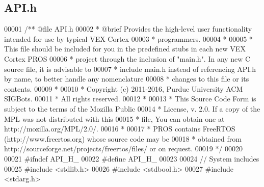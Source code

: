 \subsection{A\+P\+I.\+h}
\label{_a_p_i_8h_source}

\begin{DoxyCode}
00001 \textcolor{comment}{/** @file API.h}
00002 \textcolor{comment}{ * @brief Provides the high-level user functionality intended for use by typical VEX Cortex}
00003 \textcolor{comment}{ * programmers.}
00004 \textcolor{comment}{ *}
00005 \textcolor{comment}{ * This file should be included for you in the predefined stubs in each new VEX Cortex PROS}
00006 \textcolor{comment}{ * project through the inclusion of "main.h". In any new C source file, it is advisable to}
00007 \textcolor{comment}{ * include main.h instead of referencing API.h by name, to better handle any nomenclature}
00008 \textcolor{comment}{ * changes to this file or its contents.}
00009 \textcolor{comment}{ *}
00010 \textcolor{comment}{ * Copyright (c) 2011-2016, Purdue University ACM SIGBots.}
00011 \textcolor{comment}{ * All rights reserved.}
00012 \textcolor{comment}{ *}
00013 \textcolor{comment}{ * This Source Code Form is subject to the terms of the Mozilla Public}
00014 \textcolor{comment}{ * License, v. 2.0. If a copy of the MPL was not distributed with this}
00015 \textcolor{comment}{ * file, You can obtain one at http://mozilla.org/MPL/2.0/.}
00016 \textcolor{comment}{ *}
00017 \textcolor{comment}{ * PROS contains FreeRTOS (http://www.freertos.org) whose source code may be}
00018 \textcolor{comment}{ * obtained from http://sourceforge.net/projects/freertos/files/ or on request.}
00019 \textcolor{comment}{ */}
00020 
00021 \textcolor{preprocessor}{#}\textcolor{preprocessor}{ifndef} \textcolor{preprocessor}{API\_H\_}
00022 \textcolor{preprocessor}{#}\textcolor{preprocessor}{define} \textcolor{preprocessor}{API\_H\_}
00023 
00024 \textcolor{comment}{// System includes}
00025 \textcolor{preprocessor}{#}\textcolor{preprocessor}{include} \textcolor{preprocessor}{<}\textcolor{preprocessor}{stdlib}\textcolor{preprocessor}{.}\textcolor{preprocessor}{h}\textcolor{preprocessor}{>}
00026 \textcolor{preprocessor}{#}\textcolor{preprocessor}{include} \textcolor{preprocessor}{<}\textcolor{preprocessor}{stdbool}\textcolor{preprocessor}{.}\textcolor{preprocessor}{h}\textcolor{preprocessor}{>}
00027 \textcolor{preprocessor}{#}\textcolor{preprocessor}{include} \textcolor{preprocessor}{<}\textcolor{preprocessor}{stdarg}\textcolor{preprocessor}{.}\textcolor{preprocessor}{h}\textcolor{preprocessor}{>}

\end{DoxyCode}
